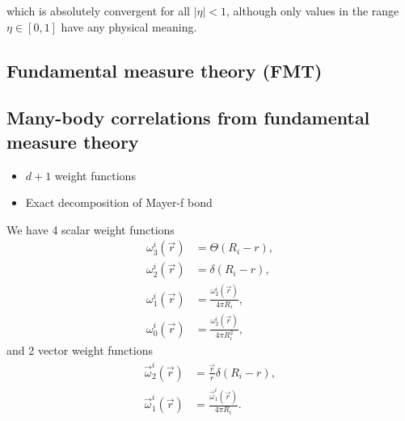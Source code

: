 \documentclass[11pt]{report}
\begin{document}
which is absolutely convergent for all $|\eta| < 1$, although only values in the range $\eta \in [0,1]$ have any physical meaning.

\subsection{Fundamental measure theory (FMT)}

\subsection{Many-body correlations from fundamental measure theory}

\begin{itemize}
\item $d+1$ weight functions
\item Exact decomposition of Mayer-f bond
\end{itemize}

We have 4 scalar weight functions
\begin{subequations}
  \begin{align}
    \omega_3^i(\vec{r}) &= \Theta(R_i - r), \\
    \omega_2^i(\vec{r}) &= \delta(R_i - r), \\
    \omega_1^i(\vec{r}) &= \frac{\omega_2^i(\vec{r})}{4\pi R_i}, \\
    \omega_0^i(\vec{r}) &= \frac{\omega_2^i(\vec{r})}{4\pi R_i^2},
  \end{align}
\end{subequations}
and 2 vector weight functions
\begin{subequations}
  \begin{align}
    \vec{\omega}_2^i(\vec{r}) &=
    \frac{\vec{r}}{r} \delta(R_i - r), \\
    \vec{\omega}_1^i(\vec{r}) &=
    \frac{\vec{\omega}_1^i(\vec{r})}{4\pi R_i}.
  \end{align}
\end{subequations}
\end{document}

